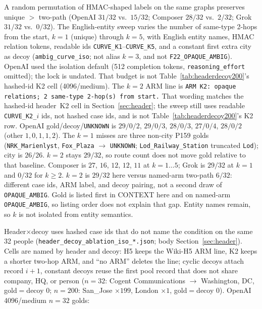 \documentclass{article}
\begin{document}
A random permutation of HMAC-shaped labels on the same graphs preserves
unique $>$ two-path (OpenAI $31/32$ vs.\ $15/32$; Composer $28/32$ vs.\
$2/32$; Grok $31/32$ vs.\ $0/32$).
The English-entity sweep varies the number of same-type 2-hops from the
start, $k{=}1$ (unique) through $k{=}5$, with English entity names, HMAC
relation tokens, readable ids \texttt{CURVE\_K1}--\texttt{CURVE\_K5}, and a
constant first extra city as decoy (\texttt{ambig\_curve\_iso}; not alias
$k{=}3$, and not \texttt{F22\_OPAQUE\_AMBIG}).
OpenAI used the isolation default (512 completion tokens,
\texttt{reasoning\_effort} omitted); the lock is undated.
That budget is not Table~\ref{tab:headerdecoy200}'s hashed-id K2 cell
(4096/medium).
The $k{=}2$ ARM line is
\texttt{ARM K2: opaque relations; 2 same-type 2-hop(s) from start.}
That wording matches the hashed-id header~K2 cell in
Section~\ref{sec:header}; the sweep still uses readable
\texttt{CURVE\_K2\_$i$} ids, not hashed case ids, and is not Table~\ref{tab:headerdecoy200}'s K2
row.
OpenAI gold/decoy/\texttt{UNKNOWN} is $29/0/2$, $29/0/3$, $28/0/3$,
$27/0/4$, $28/0/2$ (other $1,0,1,1,2$).
The $k{=}1$ misses are three non-city P159 golds
(\texttt{NRK\_Marienlyst}, \texttt{Fox\_Plaza} $\to$ \texttt{UNKNOWN};
\texttt{Lod\_Railway\_Station} truncated \texttt{Lod}); city is $26/26$.
$k{=}2$ stays $29/32$, so route count does not move gold relative to that
baseline.
Composer is $27$, $16$, $12$, $12$, $11$ at $k{=}1{\ldots}5$; Grok is
$29/32$ at $k{=}1$ and $0/32$ for $k{\ge}2$.
$k{=}2$ is $29/32$ here versus named-arm two-path $6/32$: different case
ids, ARM label, and decoy pairing, not a second draw of
\texttt{OPAQUE\_AMBIG}.
Gold is listed first in CONTEXT here and on named-arm
\texttt{OPAQUE\_AMBIG}, so listing order does not explain that gap.
Entity names remain, so $k$ is not isolated from entity semantics.

Header$\times$decoy uses hashed case ids that do not name the condition
on the same 32 people
(\texttt{header\_decoy\_ablation\_iso\_*.json}; body
Section~\ref{sec:header}).
Cells are named by header and decoy:
H5 keeps the Wiki-H5 ARM line, K2 keeps a shorter two-hop ARM, and
``no ARM'' deletes the line; cyclic decoys attach record $i{+}1$, constant
decoys reuse the first pool record that does not share company, HQ, or
person ($n{=}32$: Cogent Communications $\to$ Washington, DC, gold$=$decoy $0$;
$n{=}200$: San\_Jose ${\times}199$, London ${\times}1$, gold$=$decoy $0$).
OpenAI 4096/medium $n{=}32$ golds:
\end{document}
